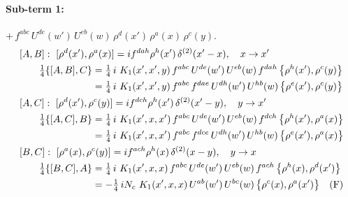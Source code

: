 \documentclass[10pt]{article}
\numberwithin{equation}{section}
\begin{document}
\paragraph{Sub-term 1:} $+\,f^{abc}\,U^{de}(w')\,U^{eb}(w)\,\rho^{d}(x')\,\rho^{a}(x)\,\rho^{c}(y)$.
\begin{align}
&[A,B]:\ [\rho^{d}(x'),\rho^{a}(x)]=i f^{dah}\rho^{h}(x')\,\delta^{(2)}(x'-x),\quad x\to x'\notag\\
&\qquad \tfrac14\{[A,B],C\}=\tfrac14\,i\,\,K_1(x',x',y)\,f^{abc}\,U^{de}(w')\,U^{eb}(w)\,f^{dah}\,\big\{\rho^{h}(x'),\rho^{c}(y)\big\}\notag\\
&\qquad\phantom{\tfrac14\{[A,B],C\}}=\tfrac14\,i\,\,K_1(x',x',y)\,f^{abc}\,f^{dae}\,U^{dh}(w')\,U^{hb}(w)\,\big\{\rho^{e}(x'),\rho^{c}(y)\big\}
\label{eq:A1-1-AB}\\
&[A,C]:\ [\rho^{d}(x'),\rho^{c}(y)]=i f^{dch}\rho^{h}(x')\,\delta^{(2)}(x'-y),\quad y\to x'\notag\\
&\qquad \tfrac14\{[A,C],B\}=\tfrac14\,i\,\,K_1(x',x,x')\,f^{abc}\,U^{de}(w')\,U^{eb}(w)\,f^{dch}\,\big\{\rho^{h}(x'),\rho^{a}(x)\big\}\notag\\
&\qquad\phantom{\tfrac14\{[A,C],B\}}=\tfrac14\,i\,\,K_1(x',x,x')\,f^{abc}\,f^{dce}\,U^{dh}(w')\,U^{hb}(w)\,\big\{\rho^{e}(x'),\rho^{a}(x)\big\}
\label{eq:A1-1-AC}\\
&[B,C]:\ [\rho^{a}(x),\rho^{c}(y)]=i f^{ach}\rho^{h}(x)\,\delta^{(2)}(x-y),\quad y\to x\notag\\
&\qquad \tfrac14\{[B,C],A\}=\tfrac14\,i\,\,K_1(x',x,x)\,f^{abc}\,U^{de}(w')\,U^{eb}(w)\,f^{ach}\,\big\{\rho^{h}(x),\rho^{d}(x')\big\}\notag\\
&\qquad\phantom{\tfrac14\{[B,C],A\}}=-\tfrac14\,i N_{c}\,\,K_1(x',x,x)\,U^{ab}(w')\,U^{bc}(w)\,\big\{\rho^{c}(x),\rho^{a}(x')\big\}\quad\text{(F)}
\label{eq:A1-1-BC}
\end{align}
\end{document}
